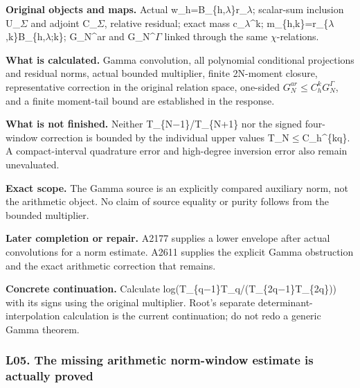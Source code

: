 \textbf{Original objects and maps.} Actual
w\_h=B\_\{h,\allowbreak{}\ensuremath{λ}\allowbreak{}\}r\_\allowbreak{}\ensuremath{λ}\allowbreak{};
scalar-sum inclusion U\_\allowbreak{}\ensuremath{Σ}\allowbreak{} and
adjoint C\_\allowbreak{}\ensuremath{Σ}\allowbreak{}, relative residual;
exact mass
c\_\allowbreak{}\ensuremath{λ}\allowbreak{}\textasciicircum{}k;
m\_\{h,k\}=r\_\{\allowbreak{}\ensuremath{λ}\allowbreak{},k\}B\_\{h,\allowbreak{}\ensuremath{λ}\allowbreak{};k\};
G\_N\^{}ar and
G\_N\textasciicircum{}\allowbreak{}\ensuremath{Γ}\allowbreak{} linked
through the same \allowbreak{}\ensuremath{χ}\allowbreak{}-relations.

\textbf{What is calculated.} Gamma convolution, all polynomial
conditional projections and residual norms, actual bounded multiplier,
finite 2N-moment closure, representative correction in the original
relation space, one-sided \(G_N^{ar}\le C_h^kG_N^{\Gamma}\), and a
finite moment-tail bound are established in the response.

\textbf{What is not finished.} Neither
T\_\{N\allowbreak{}\ensuremath{−}\allowbreak{}1\}/T\_\{N+1\} nor the
signed four-window correction is bounded by the individual upper values
T\_N\allowbreak{}\ensuremath{≤}\allowbreak{}C\_h\textasciicircum{}\{kq\}.
A compact-interval quadrature error and high-degree inversion error also
remain unevaluated.

\textbf{Exact scope.} The Gamma source is an explicitly compared
auxiliary norm, not the arithmetic object. No claim of source equality
or purity follows from the bounded multiplier.

\textbf{Later completion or repair.} A2177 supplies a lower envelope
after actual convolutions for a norm estimate. A2611 supplies the
explicit Gamma obstruction and the exact arithmetic correction that
remains.

\textbf{Concrete continuation.} Calculate
log(T\_\{q\allowbreak{}\ensuremath{−}\allowbreak{}1\}T\_q/(T\_\{2q\allowbreak{}\ensuremath{−}\allowbreak{}1\}T\_\{2q\}))
with its signs using the original multiplier. Root's separate
determinant-interpolation calculation is the current continuation; do
not redo a generic Gamma theorem.

\subsubsection{L05. The missing arithmetic norm-window estimate is
actually
proved}\label{l05.-the-missing-arithmetic-norm-window-estimate-is-actually-proved}

